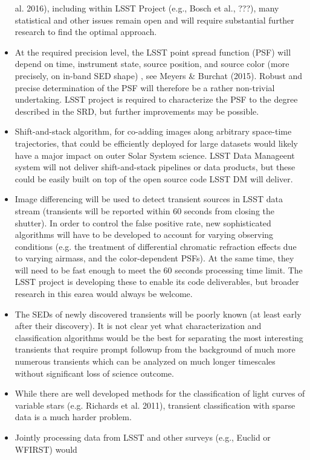 \documentclass{iau}
\begin{document}
\begin{itemize}
  al. 2016), including within LSST Project (e.g., Bosch et al., ???),
  many statistical and other issues remain open and will require
  substantial further research to find the optimal approach.
\item At the required precision level, the LSST point spread function
  (PSF) will depend on time, instrument state, source position, and
  source color (more precisely, on in-band SED shape) , see Meyers \&
  Burchat (2015). Robust and precise determination of the PSF will
  therefore be a rather non-trivial undertaking. LSST project is
  required to characterize the PSF to the degree described in the SRD,
  but further improvements may be possible.
\item Shift-and-stack algorithm, for co-adding images along arbitrary
  space-time trajectories, that could be efficiently deployed for
  large datasets would likely have a major impact on outer Solar
  System science. LSST Data Manageent system will not deliver
  shift-and-stack pipelines or data products, but these could be easily
  built on top of the open source code LSST DM will deliver.
\item Image differencing will be used to detect transient sources in
  LSST data stream (transients will be reported within 60 seconds from
  closing the shutter). In order to control the false positive rate,
  new sophisticated algorithms will have to be developed to account
  for varying observing conditions (e.g. the treatment of differential
  chromatic refraction effects due to varying airmass, and the
  color-dependent PSFs). At the same time, they will need to be fast
  enough to meet the 60 seconds processing time limit. The LSST project
  is developing these to enable its code deliverables, but broader
  research in this earea would always be welcome.
\item The SEDs of newly discovered transients will be poorly known (at least early after their discovery).
It is not clear yet what characterization and classification algorithms would be the best for separating 
the most interesting transients that require prompt followup from the background of much more numerous
transients which can be analyzed on much longer timescales without significant loss of science outcome.
\item While there are well developed methods for the classification of light curves of variable stars
(e.g. Richards et al. 2011), transient classification with sparse data is a much harder problem. 
\item Jointly processing data from LSST and other surveys (e.g., Euclid or WFIRST) would

\end{itemize}
\end{document}
